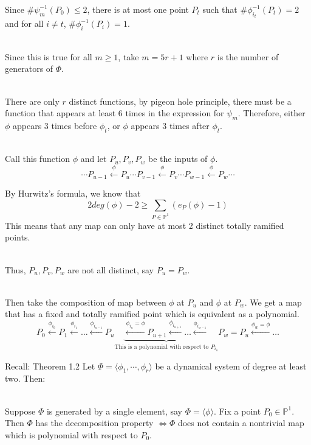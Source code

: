 \documentclass[aspectratio=169,xcolor=dvipsnames]{beamer}
\begin{document}
\begin{frame}
    Since $\#\psi_m^{-1}(P_0)\leq 2$, there is at most one point $P_t$ such that $\#\phi^{-1}_{i_t}(P_t) = 2$ and for all $i\neq t$, $\#\phi_i^{-1}(P_i) = 1$. \pause \\~
    
    Since this is true for all $m\geq1$, take $m=5r+1$ where $r$ is the number of generators of $\Phi$.\pause \\~
    
    There are only $r$ distinct functions, by pigeon hole principle, there must be a function that appears at least 6 times in the expression for $\psi_m$. Therefore, either $\phi$ appears 3 times before $\phi_t$, or $\phi$ appears 3 times after $\phi_t$. \pause \\~
    
    Call this function $\phi$ and let $P_{u}, P_{v}, P_{w}$ be the inputs of $\phi$.
    $$\cdots P_{u-1}\xleftarrow{\phi}P_u\cdots P_{v-1}\xleftarrow{\phi}P_v\cdots P_{w-1}\xleftarrow{\phi}P_w \cdots$$
\end{frame}
\begin{frame}

    By Hurwitz's formula, we know that $$2deg(\phi)-2\geq\sum_{P\in \mathbb{P}^1}(e_P(\phi)-1)$$ 
    This means that any map can only have at most 2 distinct totally ramified points.\pause \\~
    
    Thus, $P_{u}, P_{v}, P_{w}$ are not all distinct, say $P_{u}=P_{w}$.\pause \\~
    
    Then take the composition of map between $\phi$ at $P_{u}$ and $\phi$ at $P_{w}$. We get a map that has a fixed and totally ramified point which is equivalent as a polynomial.
    $$P_0\xleftarrow{\phi_{i_0}}P_1\xleftarrow{\phi_{i_1}}\dots \xleftarrow{\phi_{i_{u-1}}}P_{u}\underbrace{\xleftarrow{\phi_{i_u} = \phi} P_{u+1}\xleftarrow{\phi_{i_{u+1}}} \dots \xleftarrow{\phi_{i_{w-1}}}}_\text{This is a polynomial with respect to $P_{i_u}$}P_{w} = P_{u}\xleftarrow{\phi_{w}=\phi}\dots$$
\end{frame}

\begin{frame}
    \begin{block}{Recall: Theorem 1.2}
        Let $\Phi = \langle \phi_1,\cdots,\phi_r\rangle$ be a dynamical system of degree at least two. Then:\\~

        Suppose $\Phi$ is generated by a single element, say $\Phi = \langle \phi \rangle$. Fix a point $P_0\in \mathbb{P}^1$. Then $\Phi$ has the decomposition property $\iff \Phi$ does not contain a nontrivial map which is polynomial with respect to $P_0$.
    \end{block}    
\end{frame}
\end{document}
